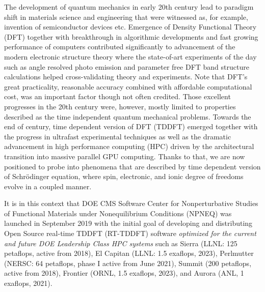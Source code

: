 The development of quantum mechanics in early 20th century lead to paradigm shift in materials science and engineering that were witnessed as, for example, invention of semiconductor devices etc. 
Emergence of Density Functional Theory (DFT) \cite{HohenbergKohn1964,KohnSham1965} together with breakthrough in algorithmic developments \cite{cooley1965,Cohen1975,Hamann1979,CarParrinello1985,Martin1988,Hamann1989,Vanderbilt1990,Payne1992,Bloechl1994,Klesse1999} and fast growing performance of computers contributed significantly to advancement of the modern electronic structure theory where the state-of-art experiments of the day such as angle resolved photo emission and parameter free DFT band structure calculations helped cross-validating theory and experiments. 
Note that DFT's great practicality, reasonable accuracy combined with affordable computational cost, was an important factor though not often credited.
Those excellent progresses in the 20th century were, however, mostly limited to properties described as the time independent quantum mechanical problems. 
Towards the end of century, time dependent version of DFT (TDDFT) emerged \cite{RungeGross1984} together with the progress in ultrafast experimental techniques as well as the dramatic advancement in high performance computing (HPC) driven by the architectural transition into massive parallel GPU computing.
Thanks to that, we are now positioned to probe into phenomena that are described by time dependent version of Schr\"{o}dinger equation, where spin, electronic, and ionic degree of freedoms evolve in a coupled manner.

It is in this context that DOE CMS Software Center for Nonperturbative Studies of Functional Materials under Nonequilibrium Conditions (NPNEQ) was launched in September 2019 with the initial goal of developing and distributing Open Source real-time TDDFT (RT-TDDFT) software \emph{optimized for the current and future DOE Leadership Class HPC systems} such as 
	Sierra (LLNL: 125 petaflops, active from 2018), 
	El Capitan (LLNL: 1.5 exaflops, 2023), 
	Perlmutter (NERSC: 64 petaflops, phase I active from June 2021), 
	Summit (200 petaflops, active from 2018), 
	Frontier (ORNL, 1.5 exaflops, 2023), 
	and Aurora (ANL, 1 exaflops, 2021). 

